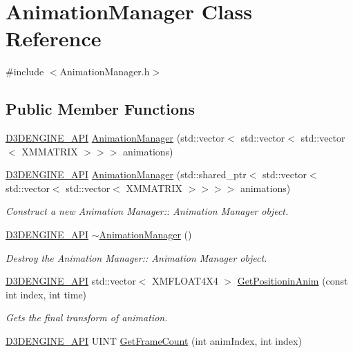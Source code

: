 \hypertarget{class_animation_manager}{}\section{Animation\+Manager Class Reference}
\label{class_animation_manager}


{\ttfamily \#include $<$Animation\+Manager.\+h$>$}

\subsection*{Public Member Functions}
\begin{DoxyCompactItemize}
\item 
\mbox{\hyperlink{stdafx_8h_a8ee2d990c5dfba7794dd2b60741d7722}{D3\+D\+E\+N\+G\+I\+N\+E\+\_\+\+A\+PI}} \mbox{\hyperlink{class_animation_manager_ae635935a07faf7523ac765e90720befd}{Animation\+Manager}} (std\+::vector$<$ std\+::vector$<$ std\+::vector$<$ X\+M\+M\+A\+T\+R\+IX $>$$>$$>$ animations)
\item 
\mbox{\hyperlink{stdafx_8h_a8ee2d990c5dfba7794dd2b60741d7722}{D3\+D\+E\+N\+G\+I\+N\+E\+\_\+\+A\+PI}} \mbox{\hyperlink{class_animation_manager_ad4c2c66a364c768d0626f60e7e0c0be0}{Animation\+Manager}} (std\+::shared\+\_\+ptr$<$ std\+::vector$<$ std\+::vector$<$ std\+::vector$<$ X\+M\+M\+A\+T\+R\+IX $>$$>$$>$$>$ animations)
\begin{DoxyCompactList}\small\item\em Construct a new Animation Manager\+:\+: Animation Manager object. \end{DoxyCompactList}\item 
\mbox{\hyperlink{stdafx_8h_a8ee2d990c5dfba7794dd2b60741d7722}{D3\+D\+E\+N\+G\+I\+N\+E\+\_\+\+A\+PI}} \mbox{\hyperlink{class_animation_manager_a3a8c725f2aa41692ed7ec4ef0957c365}{$\sim$\+Animation\+Manager}} ()
\begin{DoxyCompactList}\small\item\em Destroy the Animation Manager\+:\+: Animation Manager object. \end{DoxyCompactList}\item 
\mbox{\hyperlink{stdafx_8h_a8ee2d990c5dfba7794dd2b60741d7722}{D3\+D\+E\+N\+G\+I\+N\+E\+\_\+\+A\+PI}} std\+::vector$<$ X\+M\+F\+L\+O\+A\+T4\+X4 $>$ \mbox{\hyperlink{class_animation_manager_a7ec02b034f66a7e6b1e4ebdc1db64db3}{Get\+Positionin\+Anim}} (const int index, int time)
\begin{DoxyCompactList}\small\item\em Gets the final transform of animation. \end{DoxyCompactList}\item 
\mbox{\hyperlink{stdafx_8h_a8ee2d990c5dfba7794dd2b60741d7722}{D3\+D\+E\+N\+G\+I\+N\+E\+\_\+\+A\+PI}} U\+I\+NT \mbox{\hyperlink{class_animation_manager_a200eb95bbc5285bfc9531e482d5f5259}{Get\+Frame\+Count}} (int anim\+Index, int index)
\end{DoxyCompactItemize}
